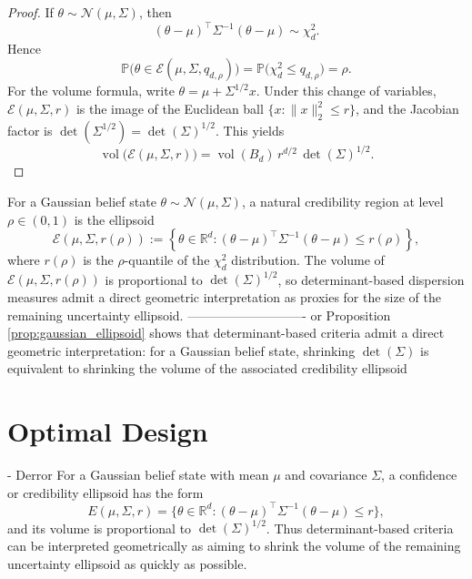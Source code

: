 \documentclass{article}
\begin{document}
\begin{proof}
If $\theta \sim \mathcal N(\mu,\Sigma)$, then
\begin{equation*}
(\theta-\mu)^\top \Sigma^{-1}(\theta-\mu) \sim \chi^2_d.
\end{equation*}
Hence
\begin{equation*}
\mathbb P\!\bigl(\theta \in \mathcal E(\mu,\Sigma,q_{d,\rho})\bigr)
=
\mathbb P\!\bigl(\chi^2_d \le q_{d,\rho}\bigr)
=
\rho.
\end{equation*}
For the volume formula, write $\theta=\mu+\Sigma^{1/2}x$. Under this change of
variables, $\mathcal E(\mu,\Sigma,r)$ is the image of the Euclidean ball
$\{x:\|x\|_2^2\le r\}$, and the Jacobian factor is $\det(\Sigma^{1/2})
= \det(\Sigma)^{1/2}$. This yields
\begin{equation*}
\operatorname{vol}\!\bigl(\mathcal E(\mu,\Sigma,r)\bigr)
=
\operatorname{vol}(B_d)\, r^{d/2}\, \det(\Sigma)^{1/2}.
\end{equation*}
\end{proof}
For a Gaussian belief state $\theta \sim \mathcal N(\mu,\Sigma)$, a natural credibility region
at level $\rho \in (0,1)$ is the ellipsoid
\begin{equation*}
\mathcal E(\mu,\Sigma,r(\rho))
:=
\left\{
\theta \in \mathbb R^d :
(\theta-\mu)^\top \Sigma^{-1} (\theta-\mu) \le r(\rho)
\right\},
\end{equation*}
where $r(\rho)$ is the $\rho$-quantile of the $\chi^2_d$ distribution. The volume of
$\mathcal E(\mu,\Sigma,r(\rho))$ is proportional to $\det(\Sigma)^{1/2}$, so determinant-based
dispersion measures admit a direct geometric interpretation as proxies for the size of the
remaining uncertainty ellipsoid. 
---------------------------- or 
Proposition \ref{prop:gaussian_ellipsoid} shows that determinant-based criteria
admit a direct geometric interpretation: for a Gaussian belief state, shrinking
$\det(\Sigma)$ is equivalent to shrinking the volume of the associated credibility
ellipsoid \cite{anderson1984} 

\section{Optimal Design}
- Derror
For a Gaussian belief
state with mean $\mu$ and covariance $\Sigma$, a confidence or credibility
ellipsoid has the form
\begin{equation*}
E(\mu,\Sigma,r)
=
\bigl\{
\theta\in\mathbb R^d:
(\theta-\mu)^\top \Sigma^{-1}(\theta-\mu)\le r
\bigr\},
\end{equation*}
and its volume is proportional to $\det(\Sigma)^{1/2}$. Thus determinant-based
criteria can be interpreted geometrically as aiming to shrink the volume of the
remaining uncertainty ellipsoid as quickly as possible.
\end{document}
